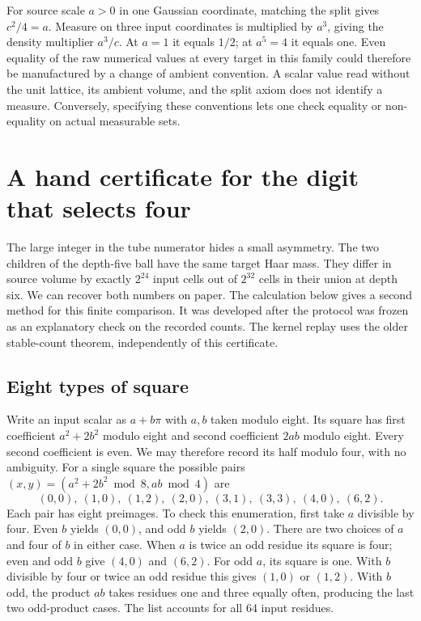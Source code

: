 \documentclass[12pt,letterpaper]{article}
\begin{document}
For source scale $a>0$ in one Gaussian coordinate, matching the split gives $c^2/4=a$. Measure on three input coordinates is multiplied by $a^3$, giving the density multiplier $a^3/c$. At $a=1$ it equals $1/2$; at $a^5=4$ it equals one. Even equality of the raw numerical values at every target in this family could therefore be manufactured by a change of ambient convention. A scalar value read without the unit lattice, its ambient volume, and the split axiom does not identify a measure. Conversely, specifying these conventions lets one check equality or non-equality on actual measurable sets.


\section{A hand certificate for the digit that selects four}
The large integer in the tube numerator hides a small asymmetry. The two children of the depth-five ball have the same target Haar mass. They differ in source volume by exactly $2^{24}$ input cells out of $2^{32}$ cells in their union at depth six. We can recover both numbers on paper. The calculation below gives a second method for this finite comparison. It was developed after the protocol was frozen as an explanatory check on the recorded counts. The kernel replay uses the older stable-count theorem, independently of this certificate.

\subsection{Eight types of square}
Write an input scalar as $a+b\pi$ with $a,b$ taken modulo eight. Its square has first coefficient $a^2+2b^2$ modulo eight and second coefficient $2ab$ modulo eight. Every second coefficient is even. We may therefore record its half modulo four, with no ambiguity. For a single square the possible pairs $(x,y)=(a^2+2b^2\bmod 8,ab\bmod4)$ are
\[
 (0,0),\ (1,0),\ (1,2),\ (2,0),\ (3,1),\ (3,3),\ (4,0),\ (6,2).
\]
Each pair has eight preimages. To check this enumeration, first take $a$ divisible by four. Even $b$ yields $(0,0)$, and odd $b$ yields $(2,0)$. There are two choices of $a$ and four of $b$ in either case. When $a$ is twice an odd residue its square is four; even and odd $b$ give $(4,0)$ and $(6,2)$. For odd $a$, its square is one. With $b$ divisible by four or twice an odd residue this gives $(1,0)$ or $(1,2)$. With $b$ odd, the product $ab$ takes residues one and three equally often, producing the last two odd-product cases. The list accounts for all 64 input residues.
\end{document}
